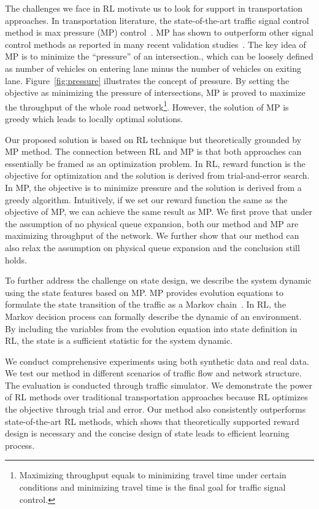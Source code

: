 The challenges we face in RL motivate us to look for support in transportation approaches. In transportation literature, the state-of-the-art traffic signal control method is max pressure (MP) control~\cite{MP13}. MP has shown to outperform other signal control methods as reported in many recent validation studies~\cite{MP13-adaptvie,MP13}. The key idea of MP is to minimize the ``pressure'' of an intersection., which can be loosely defined as number of vehicles on entering lane minus the number of vehicles on exiting lane. Figure~\ref{fig:pressure} illustrates the concept of pressure. By setting the objective as minimizing the pressure of intersections, MP is proved to maximize the throughput of the whole road network\footnote{Maximizing throughput equals to minimizing travel time under certain conditions and minimizing travel time is the final goal for traffic signal control.}. However, the solution of MP is greedy which leads to locally optimal solutions. 

Our proposed solution is based on RL technique but theoretically grounded by MP method. The connection between RL and MP is that both approaches can essentially be framed as an optimization problem. In RL, reward function is the objective for optimization and the solution is derived from trial-and-error search. In MP, the objective is to minimize pressure and the solution is derived from a greedy algorithm. Intuitively, if we set our reward function the same as the objective of MP, we can achieve the same result as MP. We first prove that under the assumption of no physical queue expansion, both our method and MP are maximizing throughput of the network. We further show that our method can also relax the assumption on physical queue expansion and the conclusion still holds.

To further address the challenge on state design, we describe the system dynamic using the state features based on MP. MP provides evolution equations to formulate the state transition of the traffic as a Markov chain~\cite{MP13book}. In RL, the Markov decision process can formally describe the dynamic of an environment. By including the variables from the evolution equation into state definition in RL, the state is a sufficient statistic for the system dynamic.

We conduct comprehensive experiments using both synthetic data and real data. We test our method in different scenarios of traffic flow and network structure. The evaluation is conducted through traffic simulator. We demonstrate the power of RL methods over traditional transportation approaches because RL optimizes the objective through trial and error. Our method also consistently outperforms state-of-the-art RL methods, which shows that theoretically supported reward design is necessary and the concise design of state leads to efficient learning process.


